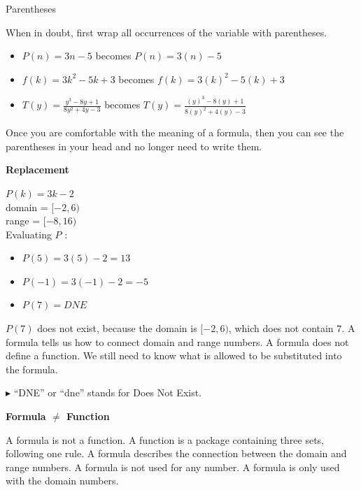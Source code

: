\documentclass{ximera}
\begin{document}
\begin{example}   Parentheses  

When in doubt, first wrap all occurrences of the variable with parentheses.
\begin{itemize}
\item $P(n) = 3n - 5$ becomes $P(n) = 3(n) - 5$ \\

\item $f(k) = 3k^2 - 5k + 3$ becomes $f(k) = 3(k)^2 - 5(k) + 3$ \\

\item $T(y) = \frac{y^3 - 8y + 1}{8y^2 + 4y - 3}$ becomes $T(y) = \frac{(y)^3 - 8(y) + 1}{8(y)^2 + 4(y) - 3}$
\end{itemize}

\end{example}

Once you are comfortable with the meaning of a formula, then you can see the parentheses in your head and no longer need to write them.










  
\begin{procedure}   \textbf{\textcolor{purple!30!blue}{Replacement}}    

$P(k) = 3k - 2$ \\
domain = $[-2, 6)$ \\
range = $[-8, 16)$ \\

Evaluating $P$ :
\begin{itemize}
\item $P(5) = 3(5) - 2 = 13$
\item $P(-1) = 3(-1) - 2 = -5$
\item $P(7) = DNE$
\end{itemize}


$P(7)$ does not exist, because the domain is $[-2, 6)$, which does not contain $7$.  A formula tells us how to connect domain and range numbers.  A formula does not define a function.  We still need to know what is allowed to be substituted into the formula.

\end{procedure}
$\blacktriangleright$ ``DNE'' or ``dne'' stands for Does Not Exist. 



\begin{warning}  \textbf{\textcolor{red!70!darkgray}{Formula $\ne$ Function}}   

A formula is not a function.  A function is a package containing three sets, following one rule.  A formula describes the connection between the domain and range numbers. A formula is not used for any number. A formula is only used with the domain numbers.

\end{warning}
\end{document}
